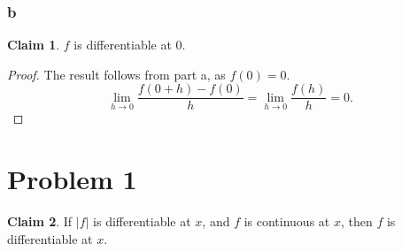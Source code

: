 \documentclass[12pt,letterpaper]{article}
\theoremstyle{definition}
\newtheorem*{claim}{Claim}
\begin{document}
\subsubsection*{b}

\begin{claim}
  $f$ is differentiable at $0$.
\end{claim}

\begin{proof}
  The result follows from part a, as $f(0) = 0$.
  \[
    \lim_{h\rightarrow 0}\frac{f(0 + h) - f(0)}{h} = \lim_{h\rightarrow
      0}\frac{f(h)}{h} = 0.
  \]
\end{proof}

\section*{Problem 1}

\begin{claim}
  If $|f|$ is differentiable at $x$, and $f$ is continuous at $x$, then $f$ is differentiable at $x$.
\end{claim}
\end{document}
